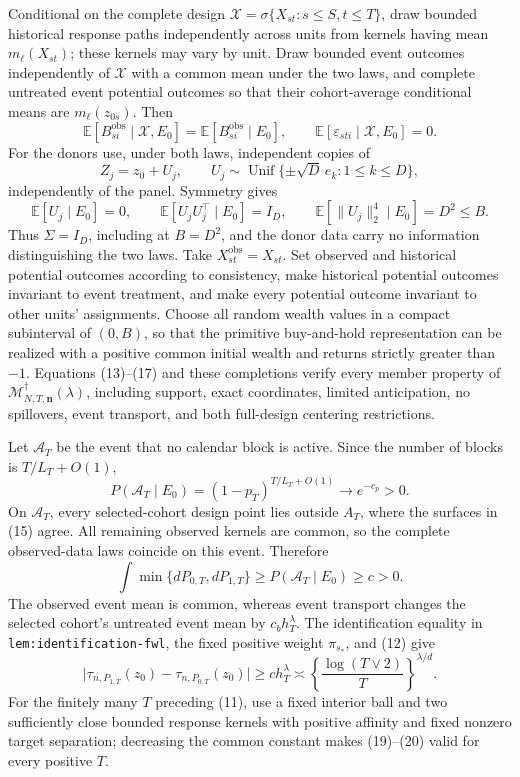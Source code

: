 Conditional on the complete design
\(\mathscr X=\sigma\{X_{st}:s\le S,t\le T\}\), draw bounded historical
response paths independently across units from kernels having mean
\(m_\ell(X_{st})\); these kernels may vary by unit.  Draw bounded event
outcomes independently of \(\mathscr X\) with a common mean under the two
laws, and complete untreated event potential outcomes so that their
cohort-average conditional means are \(m_\ell(z_{0s})\).  Then
\[
\mathbb E[B_{si}^{\mathrm{obs}}\mid\mathscr X,E_0]
=\mathbb E[B_{si}^{\mathrm{obs}}\mid E_0],
\qquad
\mathbb E[\varepsilon_{sti}\mid\mathscr X,E_0]=0.
\tag{16}
\]
For the donors use, under both laws, independent copies of
\[
Z_j=z_0+U_j,
\qquad
U_j\sim\operatorname{Unif}\{\pm\sqrt D\,e_k:1\le k\le D\},
\]
independently of the panel.  Symmetry gives
\[
\mathbb E[U_j\mid E_0]=0,
\qquad
\mathbb E[U_jU_j^\top\mid E_0]=I_D,
\qquad
\mathbb E[\lVert U_j\rVert_2^4\mid E_0]=D^2\le B.
\tag{17}
\]
Thus \(\Sigma=I_D\), including at \(B=D^2\), and the donor data carry no
information distinguishing the two laws.  Take
\(X_{st}^{\mathrm{obs}}=X_{st}\).  Set observed and historical potential
outcomes according to consistency, make historical potential outcomes
invariant to event treatment, and make every potential outcome invariant to
other units' assignments.  Choose all random wealth values in a compact
subinterval of \((0,B)\), so that the primitive buy-and-hold representation
can be realized with a positive common initial wealth and returns strictly
greater than \(-1\).  Equations (13)--(17) and these completions verify every
member property of
\(\mathcal M_{N,T,\mathbf n}^{\dagger}(\lambda)\), including support, exact
coordinates, limited anticipation, no spillovers, event transport, and both
full-design centering restrictions.

Let \(\mathcal A_T\) be the event that no calendar block is active.  Since the
number of blocks is \(T/L_T+O(1)\),
\[
P(\mathcal A_T\mid E_0)
=(1-p_T)^{T/L_T+O(1)}\longrightarrow e^{-c_p}>0.
\tag{18}
\]
On \(\mathcal A_T\), every selected-cohort design point lies outside \(A_T\),
where the surfaces in (15) agree.  All remaining observed kernels are common,
so the complete observed-data laws coincide on this event.  Therefore
\[
\int\min\{dP_{0,T},dP_{1,T}\}
\ge P(\mathcal A_T\mid E_0)\ge c>0.
\tag{19}
\]
The observed event mean is common, whereas event transport changes the
selected cohort's untreated event mean by \(c_bh_T^\lambda\).  The
identification equality in \texttt{lem:identification-fwl}, the fixed positive
weight \(\pi_{s_*}\), and (12) give
\[
\lvert\tau_{n,P_{1,T}}(z_0)-\tau_{n,P_{0,T}}(z_0)\rvert
\ge ch_T^\lambda
\asymp\left\{\frac{\log(T\vee2)}{T}\right\}^{\lambda/d}.
\tag{20}
\]
For the finitely many \(T\) preceding (11), use a fixed interior ball and two
sufficiently close bounded response kernels with positive affinity and fixed
nonzero target separation; decreasing the common constant makes (19)--(20)
valid for every positive \(T\).

